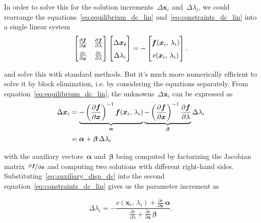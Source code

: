 In order to solve this for the solution increments~$\Delta\boldsymbol{x}_{i}$ and~$\Delta\lambda_{i}$, we could rearrange the equations~\eqref{eq:equilibrium_dc_lin} and~\eqref{eq:constraints_dc_lin} into a single linear system
%
\begin{align}
\renewcommand{\arraystretch}{1.5}
\begin{bmatrix}
\frac{\partial\boldsymbol{f}}{\partial\boldsymbol{x}} & \frac{\partial\boldsymbol{f}}{\partial\lambda} \\
\frac{\partial c}{\partial\boldsymbol{x}} & \frac{\partial c}{\partial\lambda}
\end{bmatrix}
\begin{bmatrix}
\Delta\boldsymbol{x_{i}}\\
\Delta\lambda_{i}
\end{bmatrix}
=
-
\begin{bmatrix}
\boldsymbol{f}(\boldsymbol{x}_{i},\,\lambda_{i}) \\
c(\boldsymbol{x}_{i},\,\lambda_{i})
\end{bmatrix}.\label{eq:total_dc_lin}
\end{align}

and solve this with standard methods.
But it's much more numerically efficient to solve it by block elimination, i.e. by considering the equations separately.
From equation~\eqref{eq:equilibrium_dc_lin}, the unknowns~$\Delta\boldsymbol{x}_{i}$ can be expressed as
%
\begin{align}
\Delta\boldsymbol{x}_{i} &= \underbrace{-\left(\frac{\partial\boldsymbol{f}}{\partial\boldsymbol{x}}\right)^{-1}\boldsymbol{f}(\boldsymbol{x}_{i},\,\lambda_{i})}_{\boldsymbol{\alpha}} \underbrace{- \left(\frac{\partial\boldsymbol{f}}{\partial\boldsymbol{x}}\right)^{-1}\frac{\partial\boldsymbol{f}}{\partial\lambda}}_{\boldsymbol{\beta}}\Delta\lambda_{i} \notag \\
&= \boldsymbol{\alpha} + \boldsymbol{\beta}\,\Delta\lambda_{i} \label{eq:auxiliary_disp_dc}
\end{align}

with the auxiliary vectors~$\boldsymbol{\alpha}$ and~$\boldsymbol{\beta}$ being computed by factorizing the Jacobian matrix~$\nicefrac{\partial\boldsymbol{f}}{\partial\boldsymbol{x}}$ and computing two solutions with different right-hand sides.
Substituting~\eqref{eq:auxiliary_disp_dc} into the second equation~\eqref{eq:constraints_dc_lin} gives us the parameter increment as

\begin{equation}
\Delta\lambda_{i} = -\frac{c(\boldsymbol{x}_{i},\,\lambda_{i}) + \frac{\partial c}{\partial\boldsymbol{x}}\,\boldsymbol{\alpha}}{\frac{\partial c}{\partial\lambda} + \frac{\partial c}{\partial\boldsymbol{x}}\,\boldsymbol{\beta}}.\label{eq:res_load_factor}
\end{equation}

